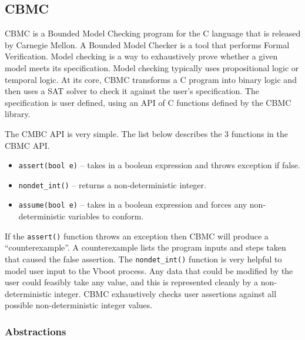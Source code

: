 \documentclass[../report.tex]{subfiles}
\def\code#1{\texttt{#1}}
\begin{document}
\subsection{CBMC}

CBMC is a Bounded Model Checking program for the C language that is released by
Carnegie Mellon. 
A Bounded Model Checker is a tool that performs Formal Verification.
Model checking is a way to exhaustively prove whether a given model meets its
specification.
Model checking typically uses propositional logic or temporal logic. 
At its core, CBMC transforms a C program into binary logic and
then uses a SAT solver to check it against the user's specification. 
The specification is user defined, using an API of C functions defined by the
CBMC library. 


The CMBC API is very simple.
The list below describes the 3 functions in the CBMC API.

\begin{itemize}
    \item \code{assert(bool e)} -- takes in a boolean expression and throws
        exception if false.
    \item \code{nondet\_int()} -- returns a non-deterministic integer.
    \item \code{assume(bool e)} -- takes in a boolean expression and forces any
        non-deterministic variables to conform.
\end{itemize}

If the \code{assert()} function throws an exception then CBMC will produce a ``counterexample''.
A counterexample lists the program inputs and steps taken that caused the false
assertion.
The \code{nondet\_int()} function is very helpful to model user input to the Vboot process.
Any data that could be modified by the user could feasibly take any
value, and this is represented cleanly by a non-deterministic integer.
CBMC exhaustively checks user assertions against all possible non-deterministic
integer values.

\subsubsection{Abstractions}
\end{document}
